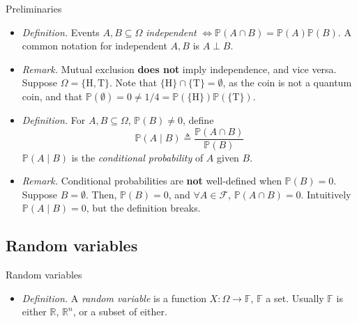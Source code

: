 \documentclass{beamer}
\begin{document}
\begin{frame}{Preliminaries}
    \begin{itemize}
        \item
        \textit{Definition.} Events $ A, B \subseteq \Omega $
        \textit{independent} $ \Leftrightarrow \mathbb{P}(A \cap B) =
        \mathbb{P}(A)\mathbb{P}(B) $. A common notation for independent
        $ A, B $ is $ A \perp B $.

        \item
        \textit{Remark.} Mutual exclusion \textbf{does not} imply independence,
        and vice versa. Suppose $ \Omega = \{\text{H}, \text{T}\} $. Note that
        $ \{\text{H}\} \cap \{\text{T}\} = \emptyset $, as the coin is not a
        quantum coin, and that $ \mathbb{P}(\emptyset) = 0 \ne 1 / 4 =
        \mathbb{P}(\{\text{H}\})\mathbb{P}(\{\text{T}\}) $.

        \item
        \textit{Definition.} For $ A, B \subseteq \Omega $,
        $ \mathbb{P}(B) \ne 0 $, define
        \begin{equation*}
            \mathbb{P}(A \mid B) \triangleq \frac{\mathbb{P}(A \cap B)}{
                \mathbb{P}(B)            
            }
        \end{equation*}
        $ \mathbb{P}(A \mid B) $ is the \textit{conditional probability} of
        $ A $ given $ B $.

        \item
        \textit{Remark.} Conditional probabilities are \textbf{not}
        well-defined when $ \mathbb{P}(B) = 0 $. Suppose $ B = \emptyset $.
        Then, $ \mathbb{P}(B) = 0 $, and $ \forall A \in \mathcal{F} $,
        $ \mathbb{P}(A \cap B) = 0 $. Intuitively
        $ \mathbb{P}(A \mid B) = 0 $, but the definition breaks.
    \end{itemize}
\end{frame}

\subsection{Random variables}

\begin{frame}{Random variables}
    \begin{itemize}
        \item
        \textit{Definition.} A \textit{random variable} is a function
        $ X : \Omega \rightarrow \mathbb{F} $, $ \mathbb{F} $ a
        set. Usually $ \mathbb{F} $ is either $ \mathbb{R} $,
        $ \mathbb{R}^n $, or a subset of either.
    \end{itemize}
\end{frame}
\end{document}
